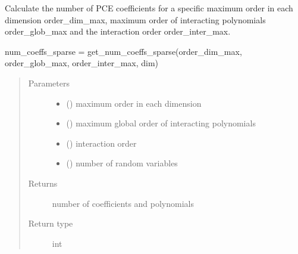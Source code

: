 \documentclass[letterpaper,10pt,english,openany,oneside]{sphinxmanual}
\begin{document}
\begin{fulllineitems}
\label{\detokenize{pygpc:pygpc.misc.get_num_coeffs_sparse}}
Calculate the number of PCE coefficients for a specific maximum order in each dimension order\_dim\_max,
maximum order of interacting polynomials order\_glob\_max and the interaction order order\_inter\_max.

num\_coeffs\_sparse = get\_num\_coeffs\_sparse(order\_dim\_max, order\_glob\_max, order\_inter\_max, dim)
\begin{quote}\begin{description}
\item[{Parameters}] \leavevmode\begin{itemize}
\item {} 
 () \textendash{} maximum order in each dimension

\item {} 
 () \textendash{} maximum global order of interacting polynomials

\item {} 
 () \textendash{} interaction order

\item {} 
 () \textendash{} number of random variables

\end{itemize}

\item[{Returns}] \leavevmode
{} \textendash{} number of coefficients and polynomials

\item[{Return type}] \leavevmode
int

\end{description}\end{quote}

\end{fulllineitems}
\end{document}
